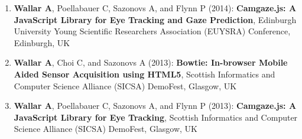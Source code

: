 \documentclass[line,margin]{cv}
\begin{document}
\begin{resume}
\begin{enumerate}
    \item \textbf{Wallar A}, Poellabauer C, Sazonovs A, and Flynn P (2014):
        \textbf{Camgaze.js: A JavaScript Library for Eye Tracking and Gaze
        Prediction}, Edinburgh University Young Scientific Researchers
        Association (EUYSRA) Conference, Edinburgh, UK

    \item \textbf{Wallar A}, Choi C, and Sazonovs A (2013): \textbf{Bowtie:
        In-browser Mobile Aided Sensor Acquisition using HTML5}, Scottish
        Informatics and Computer Science Alliance (SICSA) DemoFest,
        Glasgow, UK

    \item \textbf{Wallar A}, Poellabauer C, Sazonovs A, and Flynn P (2013):
        \textbf{Camgaze.js: A JavaScript Library for Eye Tracking}, Scottish
        Informatics and Computer Science Alliance (SICSA) DemoFest, Glasgow, UK

\end{enumerate}

%
%
%

\end{resume}
\end{document}
